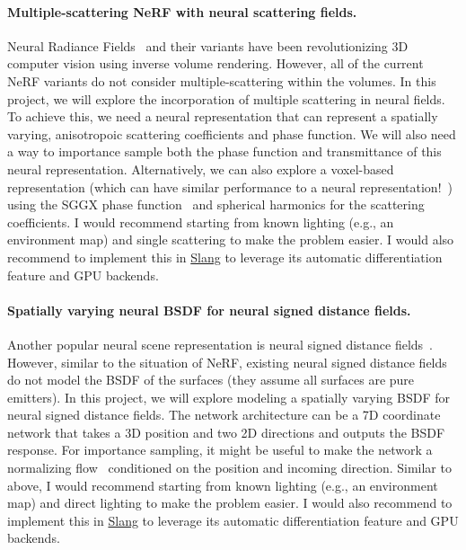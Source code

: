 \paragraph{Multiple-scattering NeRF with neural scattering fields.}
Neural Radiance Fields~\cite{Mildenhall:2021:NRS} and their variants have been revolutionizing 3D computer vision using inverse volume rendering.
However, all of the current NeRF variants do not consider multiple-scattering within the volumes.
In this project, we will explore the incorporation of multiple scattering in neural fields.
To achieve this, we need a neural representation that can represent a spatially varying, anisotropoic scattering coefficients and phase function.
We will also need a way to importance sample both the phase function and transmittance of this neural representation.
Alternatively, we can also explore a voxel-based representation (which can have similar performance to a neural representation!~\cite{KeilYu:2021:PRF}) using the SGGX phase function~\cite{Heitz:2015:SMD} and spherical harmonics for the scattering coefficients.
I would recommend starting from known lighting (e.g., an environment map) and single scattering to make the problem easier.
I would also recommend to implement this in \href{https://developer.nvidia.com/blog/differentiable-slang-example-applications/}{Slang} to leverage its automatic differentiation feature and GPU backends.

\paragraph{Spatially varying neural BSDF for neural signed distance fields.}
Another popular neural scene representation is neural signed distance fields~\cite{Bangaru:2022:DRN}.
However, similar to the situation of NeRF, existing neural signed distance fields do not model the BSDF of the surfaces (they assume all surfaces are pure emitters).
In this project, we will explore modeling a spatially varying BSDF for neural signed distance fields.
The network architecture can be a 7D coordinate network that takes a 3D position and two 2D directions and outputs the BSDF response.
For importance sampling, it might be useful to make the network a normalizing flow~\cite{Muller:2019:NIS} conditioned on the position and incoming direction. Similar to above, I would recommend starting from known lighting (e.g., an environment map) and direct lighting to make the problem easier.
I would also recommend to implement this in \href{https://developer.nvidia.com/blog/differentiable-slang-example-applications/}{Slang} to leverage its automatic differentiation feature and GPU backends.

